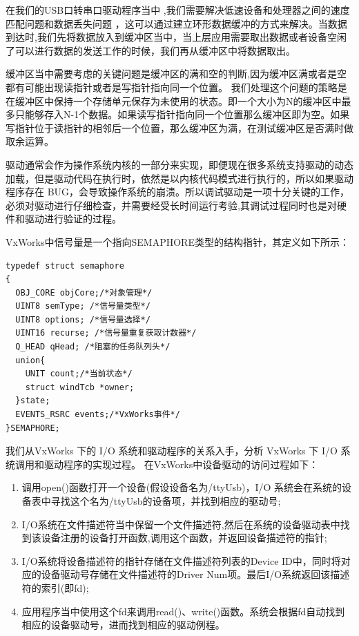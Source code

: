 在我们的USB口转串口驱动程序当中 ,我们需要解决低速设备和处理器之间的速度匹配问题和数据丢失问题 ，这可以通过建立环形数据缓冲的方式来解决。当数据到达时,我们先将数据放入到缓冲区当中，当上层应用需要取出数据或者设备空闲了可以进行数据的发送工作的时候，我们再从缓冲区中将数据取出。











缓冲区当中需要考虑的关键问题是缓冲区的满和空的判断,因为缓冲区满或者是空都有可能出现读指针或者是写指针指向同一个位置。 我们处理这个问题的策略是在缓冲区中保持一个存储单元保存为未使用的状态。即一个大小为N的缓冲区中最多只能够存入N-1个数据。如果读写指针指向同一个位置那么缓冲区即为空。如果写指针位于读指针的相邻后一个位置，那么缓冲区为满，在测试缓冲区是否满时做取余运算。

驱动通常会作为操作系统内核的一部分来实现，即便现在很多系统支持驱动的动态加载，但是驱动代码在执行时，依然是以内核代码模式进行执行的，所以如果驱动程序存在 BUG，会导致操作系统的崩溃。所以调试驱动是一项十分关键的工作，必须对驱动进行仔细检查，并需要经受长时间运行考验,其调试过程同时也是对硬件和驱动进行验证的过程。

VxWorks中信号量是一个指向SEMAPHORE类型的结构指针，其定义如下所示\cite{胡明民2012基于实时操作系统}：
\lstset{language=C}
\begin{lstlisting}
typedef struct semaphore
{
  OBJ_CORE objCore;/*对象管理*/
  UINT8 semType; /*信号量类型*/
  UINT8 options; /*信号量选择*/
  UINT16 recurse; /*信号量重复获取计数器*/
  Q_HEAD qHead; /*阻塞的任务队列头*/
  union{
	UNIT count;/*当前状态*/
	struct windTcb *owner;  
  }state;
  EVENTS_RSRC events;/*VxWorks事件*/
}SEMAPHORE;
\end{lstlisting}  




我们从VxWorks 下的 I/O 系统和驱动程序的关系入手，分析 VxWorks 下 I/O 系统调用和驱动程序的实现过程。
在VxWorks中设备驱动的访问过程如下：
\begin{enumerate}
\item 调用open()函数打开一个设备(假设设备名为/ttyUsb)，I/O 系统会在系统的设备表中寻找这个名为/ttyUsb的设备项，并找到相应的驱动号; 
\item I/O系统在文件描述符当中保留一个文件描述符,然后在系统的设备驱动表中找到该设备注册的设备打开函数,调用这个函数，并返回设备描述符的指针;
\item I/O系统将设备描述符的指针存储在文件描述符列表的Device ID中，同时将对应的设备驱动号存储在文件描述符的Driver Num项。最后I/O系统返回该描述符的索引(即fd);
\item 应用程序当中使用这个fd来调用read()、write()函数。系统会根据fd自动找到相应的设备驱动号，进而找到相应的驱动例程\cite{解月江2004VxWorks设备驱动技术研究}。 
\end{enumerate}








